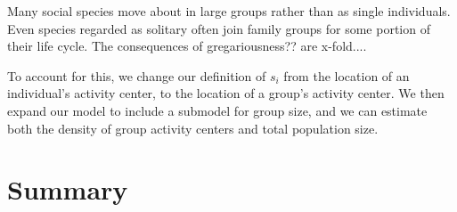Many social species move about in large groups rather than as single
individuals. Even species regarded as solitary often join family
groups for some portion of their life cycle. The consequences of
gregariousness?? are x-fold....

To account for this, we change our definition of $s_i$ from the
location of an individual's activity center, to the location of a
group's activity center. We then expand our model to include a
submodel for group size, and we can estimate both the density of group
activity centers and total population size.






\section{Summary}